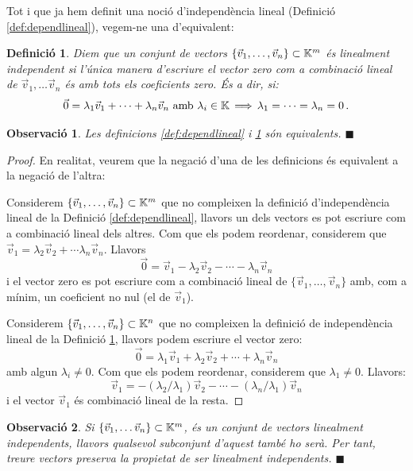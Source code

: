 \documentclass[
  11pt,
]{book}
\numberwithin{dummy}{section}
\theoremstyle{maincolornumbox}
\newtheorem{remarkT}{Observació}[chapter]
\theoremstyle{blacknumex}
\theoremstyle{blacknumbox}
\newtheorem{definitionT}{Definició}[chapter]
\theoremstyle{maincolornum}
\newenvironment{definition}{\begin{dBox}\begin{definitionT}}{\end{definitionT}\end{dBox}}
\newenvironment{remark}{\begin{remarkT}}{\hfill{\tiny\ensuremath{\blacksquare}}\end{remarkT}}
\begin{document}
Tot i que ja hem definit una noció d'independència lineal (Definició
\ref{def:dependlineal}), vegem-ne una d'equivalent:

\begin{definition}
\protect\hypertarget{def:indeplin}{}\label{def:indeplin}Diem que un conjunt de vectors
\(\{\vec v_1, \dots , \vec v_n\} \subset \mathbb{K}^m\) és \emph{linealment
independent} si l'única manera d'escriure el vector zero com a
combinació lineal de \(\vec v_1, \dots \vec v_n\) és amb tots els
coeficients zero. És a dir, si:
\[\vec 0 = \lambda_1 \vec v_1+\cdots +\lambda_n\vec v_n \text{ amb $\lambda_i\in\mathbb{K}$} \, \Longrightarrow \, \lambda_1=\cdots =\lambda_n=0 \,.\]
\end{definition}

\begin{remark}
Les definicions
\ref{def:dependlineal} i
\ref{def:indeplin} són equivalents.
\end{remark}

\begin{proof}
En realitat, veurem que la negació d'una de les definicions és
equivalent a la negació de l'altra:

Considerem \(\{\vec v_1, \dots , \vec v_n\} \subset \mathbb{K}^m\) que no
compleixen la definició d'independència lineal de la Definició
\ref{def:dependlineal}, llavors un dels vectors es pot escriure
com a combinació lineal dels altres. Com que els podem reordenar,
considerem que \(\vec v_1=\lambda_2\vec v_2+\cdots \lambda_n\vec v_n\).
Llavors
\[\vec 0 = \vec v_1- \lambda_2 \vec v_2 - \cdots -\lambda_n\vec v_n\] i
el vector zero es pot escriure com a combinació lineal de
\(\{\vec v_1, \dots , \vec v_n\}\) amb, com a mínim, un coeficient no nul
(el de \(\vec v_1\)).

Considerem \(\{\vec v_1, \dots , \vec v_n\} \subset \mathbb{K}^n\) que no
compleixen la definició de independència lineal de la Definició
\ref{def:indeplin}, llavors podem escriure el vector zero:
\[\vec 0 = \lambda_1\vec v_1+ \lambda_2 \vec v_2 + \cdots +\lambda_n\vec v_n\]
amb algun \(\lambda_i\neq 0\). Com que els podem reordenar, considerem que
\(\lambda_1\neq 0\). Llavors:
\[\vec v_1 = -(\lambda_2/\lambda_1) \vec v_2 - \cdots -(\lambda_n/\lambda_1)\vec v_n\]
i el vector \(\vec v_1\) és combinació lineal de la resta.
\end{proof}

\begin{remark}
Si
\(\{\vec v_1, \dots \vec v_n\}\subset \mathbb{K}^m\), és un conjunt de vectors
linealment independents, llavors qualsevol subconjunt d'aquest també ho
serà. Per tant, treure vectors preserva la propietat de ser linealment
independents.
\end{remark}
\end{document}
